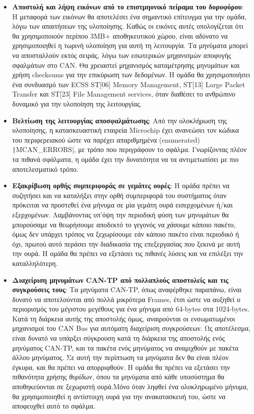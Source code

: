 \documentclass[a4paper,nobib,justified]{tufte-book}
\begin{document}
\begin{itemize}
	\item \textbf{Αποστολή και λήψη εικόνων από το επιστμηονικό πείραμα του δορυφόρου}: Η μεταφορά των εικόνων θα αποτελέσει ένα σημαντικό επίτευγμα για την ομάδα, λόγω των απαιτήσεων της υλοποίησης. Καθώς οι εικόνες αυτές υπολογίζεται ότι θα χρησιμοποιούν περίπου 3MB+ αποθηκευτικού χώρου, είναι αδύνατο να χρησιμοποιηθεί η τωρινή υλοποίηση για αυτή τη λειτουργία. Τα μηνύματα μπορεί να αποσταλλούν εκτός σειράς, λόγω των εσωτερικών μηχανισμών αποφυγής σφαλμάτων στο CAN. Θα χρειαστεί μηχανισμός καταμέτρησης μηνυμάτων και χρήση checksums για την επικύρωση των δεδομένων. Η ομάδα θα χρησιμοποιήσει ένα συνδυασμό των ECSS ST[06] Memory Management, ST[13] Large Packet Transfer και ST[23] File Management services, όταν διαθέσει το ανθρώπινο δυναμικό για την υλοποίηση της λειτουργίας.
	\item \textbf{Βελτίωση της λειτουργίας αποσφαλμάτωσης}: Από την ολοκλήρωση της υλοποίησης, η κατασκευαστική εταιρεία Microchip έχει ανανεώσει τον κώδικα του περιφερειακού ώστε να παρέχει απαριθμημένα (enumerated) \texttt|MCAN_ERRORS|, με τρόπο που περιγράφουν το σφάλμα. Γνωρίζοντας πλέον τα πιθανά σφάλματα, η ομάδα έχει την δυνατότητα να τα αντιμετωπίσει με πιο αποτελεσματικό τρόπο.
	\item \textbf{Εξακρίβωση ορθής συμπεριφοράς σε γεμάτες ουρές}: Η ομάδα πρέπει να συζητήσει και να καταλήξει στην ορθή συμπεριφορά του συστήματος όταν πρόκειται να προστεθεί ένα μήνυμα σε μία γεμάτη ουρά εισερχομένων ή/και εξερχομένων. Λαμβάνοντας υπ'όψη την περιοδική φύση των μηνυμάτων θα μπορούσαμε να θεωρήσουμε αποδεκτό το γεγονός να \emph{χάσουμε} κάποιο πακέτο, όμως δεν υπάρχει τρόπος να ξεχωρίσουμε εάν κάποιο πακέτο είναι περιοδικό ή όχι, πρωτού αυτό περάσει την διαδικασία της επεξεργασίας που ξεκινά με αυτή την ουρά. Η ομάδα θα πρέπει να εξετάσει τις πιθανές λύσεις και να επιλέξει την καταλληλότερη. 
	\item \textbf{Διαχείριση μηνυμάτων CAN-TP από πολλαπλούς αποστολείς και τις συγκρούσεις τους}: Τα μηνύματα CAN-TP, όπως αναφέρθηκε παραπάνω, είναι δυνατό να αποτελούνται από πολλά μικρότερα Frames, έτσι ώστε να αυξηθεί ο περιορισμός του μέγιστου μεγέθους για ένα μήνυμα από 64-bytes στα 1024-bytes. Κατά τη διάρκεια αυτής της αποστολής όμως, αναιρούνται οι ενσωματωμένοι μηχανισμοί του CAN Bus για αυτόματη διαχείριση συγκρούσεων. Ως αποτέλεσμα, είναι δυνατό να υπάρξει σύγκρουση κατά τη διάρκεια της αποστολής ενός μηνύματος CAN-TP, και τα πακέτα ενός μηνύματος να αναμιχθούν με πακέτα άλλου μηνύματος. Σε αυτή την περίπτωση τα μηνύματα δεν θα είναι πλέον έγκυρα, και θα πρέπει να απορριφθούν. Η ομάδα θα πρέπει να εξετάσει την πιθανότητα χρήσης \emph{θυρίδων}, όπου τα μηνύματα από κάθε υποσύστημα θα αποθηκεύονται σε ξεχωριστή ουρά.Μόνο όταν ληφθεί ένα ολοκληρωμένο μήνυμα, θα χρησιμοποιηθεί η αντίστοιχη ουρά για την ανακατασκευή του, ώστε να αποφευχθεί αυτό το σφάλμα.

\end{itemize}
\end{document}
